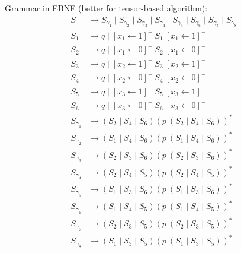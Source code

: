 Grammar in EBNF (better for tensor-based algorithm):
\begin{align*}
S & \to S_{\gamma_1} \mid S_{\gamma_2} \mid S_{\gamma_3} \mid S_{\gamma_4} \mid S_{\gamma_5} \mid S_{\gamma_6} \mid S_{\gamma_7} \mid S_{\gamma_8}\\
S_1 & \to q  
      \mid [x_1 \leftarrow 1]^+ \ S_1 \ [x_1 \leftarrow 1]^- \\ 
S_2 & \to q  
      \mid [x_1 \leftarrow 0]^+ \ S_2 \ [x_1 \leftarrow 0]^- \\ 
S_3 & \to q  
      \mid [x_2 \leftarrow 1]^+ \ S_3 \ [x_2 \leftarrow 1]^- \\ 
S_4 & \to q 
      \mid [x_2 \leftarrow 0]^+ \ S_4 \ [x_2 \leftarrow 0]^- \\ 
S_5 & \to q
      \mid [x_3 \leftarrow 1]^+ \ S_5 \ [x_3 \leftarrow 1]^- \\ 
S_6 & \to q
      \mid [x_3 \leftarrow 0]^+ \ S_6 \ [x_3 \leftarrow 0]^- \\ 
S_{\gamma_1} & \to (S_2 \mid S_4 \mid S_6) (p \ (S_2 \mid S_4 \mid S_6))^*\\
S_{\gamma_2} & \to (S_1 \mid S_4 \mid S_6) (p \ (S_1 \mid S_4 \mid S_6))^*\\
S_{\gamma_3} & \to (S_2 \mid S_3 \mid S_6) (p \ (S_2 \mid S_3 \mid S_6))^*\\
S_{\gamma_4} & \to (S_2 \mid S_4 \mid S_5) (p \ (S_2 \mid S_4 \mid S_5))^*\\
S_{\gamma_5} & \to (S_1 \mid S_3 \mid S_6) (p \ (S_1 \mid S_3 \mid S_6))^*\\
S_{\gamma_6} & \to (S_1 \mid S_4 \mid S_5) (p \ (S_1 \mid S_4 \mid S_5))^*\\
S_{\gamma_7} & \to (S_2 \mid S_3 \mid S_5) (p \ (S_2 \mid S_3 \mid S_5))^*\\
S_{\gamma_8} & \to (S_1 \mid S_3 \mid S_5) (p \ (S_1 \mid S_3 \mid S_5))^*\\
\end{align*}


